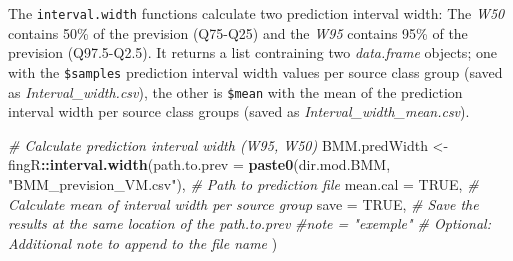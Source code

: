 \documentclass[
]{article}
\newenvironment{Shaded}{\begin{snugshade}}{\end{snugshade}}
\newcommand{\AttributeTok}[1]{\textcolor[rgb]{0.13,0.29,0.53}{#1}}
\newcommand{\CommentTok}[1]{\textcolor[rgb]{0.56,0.35,0.01}{\textit{#1}}}
\newcommand{\ConstantTok}[1]{\textcolor[rgb]{0.56,0.35,0.01}{#1}}
\newcommand{\DecValTok}[1]{\textcolor[rgb]{0.00,0.00,0.81}{#1}}
\newcommand{\FunctionTok}[1]{\textcolor[rgb]{0.13,0.29,0.53}{\textbf{#1}}}
\newcommand{\NormalTok}[1]{#1}
\newcommand{\OtherTok}[1]{\textcolor[rgb]{0.56,0.35,0.01}{#1}}
\newcommand{\SpecialCharTok}[1]{\textcolor[rgb]{0.81,0.36,0.00}{\textbf{#1}}}
\newcommand{\StringTok}[1]{\textcolor[rgb]{0.31,0.60,0.02}{#1}}
\begin{document}
The \texttt{interval.width} functions calculate two prediction interval
width: The \emph{W50} contains 50\% of the prevision (Q75-Q25) and the
\emph{W95} contains 95\% of the prevision (Q97.5-Q2.5). It returns a
list contraining two \emph{data.frame} objects; one with the
\texttt{\$samples} prediction interval width values per source class
group (saved as \emph{Interval\_width.csv}), the other is
\texttt{\$mean} with the mean of the prediction interval width per
source class groups (saved as \emph{Interval\_width\_mean.csv}).

\begin{Shaded}
\begin{Highlighting}[]
\CommentTok{\# Calculate prediction interval width (W95, W50)}
\NormalTok{BMM.predWidth }\OtherTok{\textless{}{-}}\NormalTok{ fingR}\SpecialCharTok{::}\FunctionTok{interval.width}\NormalTok{(}\AttributeTok{path.to.prev =} \FunctionTok{paste0}\NormalTok{(dir.mod.BMM, }\StringTok{"BMM\_prevision\_VM.csv"}\NormalTok{), }\CommentTok{\# Path to prediction file}
                                       \AttributeTok{mean.cal =} \ConstantTok{TRUE}\NormalTok{,                                            }\CommentTok{\# Calculate mean of interval width per source group}
                                       \AttributeTok{save =} \ConstantTok{TRUE}\NormalTok{,                                                }\CommentTok{\# Save the results at the same location of the path.to.prev}
                                       \CommentTok{\#note = "exemple"                                           \# Optional: Additional note to append to the file name}
\NormalTok{                                       )}
\end{Highlighting}
\end{Shaded}

\begin{Shaded}
\end{Shaded}
\end{document}

